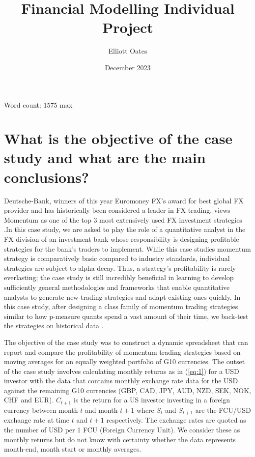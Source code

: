 \documentclass{article}
\title{Financial Modelling Individual Project}
\author{Elliott Oates}
\date{December 2023}
\begin{document}
\maketitle

Word count: 1575 max 

\newpage\section*{What is the objective of the case study and what are the main conclusions?}

Deutsche-Bank, winners of this year Euromoney FX's award for best global FX provider and has historically been considered a leader in FX trading, views Momentum as one of the top 3 most extensively used FX investment strategies \cite{euromoney2023,deutschebank2009}.In this case study, we are asked to play the role of a quantitative analyst in the FX division of an investment bank whose responsibility is designing profitable strategies for the bank's traders to implement. While this case studies momentum strategy is comparatively basic compared to industry standards, individual strategies are subject to alpha decay. Thus, a strategy's profitability is rarely everlasting; the case study is still incredibly beneficial in learning to develop sufficiently general methodologies and frameworks that enable quantitative analysts to generate new trading strategies and adapt existing ones quickly. In this case study, after designing a class family of momentum trading strategies similar to how p-measure quants spend a vast amount of their time, we back-test the strategies on historical data \cite{efinancialcareers2023}.

The objective of the case study was to construct a dynamic spreadsheet that can report and compare the profitability of momentum trading strategies based on moving averages for an equally weighted portfolio of G10 currencies. The outset of the case study involves calculating monthly returns as in (\ref{eq:1}) for a USD investor with the data that contains monthly exchange rate data for the USD against the remaining G10 currencies (GBP, CAD, JPY, AUD, NZD, SEK, NOK, CHF and EUR). $C_{t+1}$ is the return for a US investor investing in a foreign currency between month $t$ and month $t+1$ where $S_{t}$ and $S_{t+1}$ are the FCU/USD exchange rate at time $t$ and $t+1$ respectively. The exchange rates are quoted as the number of USD per 1 FCU (Foreign Currency Unit). We consider these as monthly returns but do not know with certainty whether the data represents month-end, month start or monthly averages. 
\end{document}
